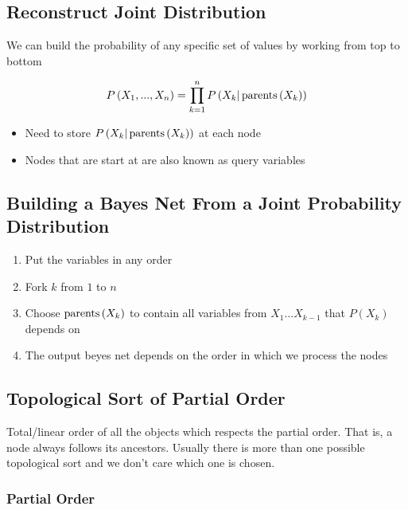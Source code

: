   \subsection{Reconstruct Joint Distribution}

    We can build the probability of any specific set of values by working
    from top to bottom

    \begin{equation}
      P\left( X_{1}, ... , X_{n} \right)
        = \prod_{k = 1}^{n} P\left( X_{k} | \operatorname{parents}\left( X_{k} \right) \right)
    \end{equation}

    \begin{itemize}
      \item Need to store $ P\left( X_{k} | \operatorname{parents}\left( X_{k} \right) \right) $
      at each node
      \item Nodes that are start at are also known as query variables
    \end{itemize}

  \subsection{Building a Bayes Net From a Joint Probability Distribution}

    \begin{enumerate}
      \item Put the variables in any order
      \item Fork $ k $ from $ 1 $ to $ n $
      \item Choose $ \operatorname{parents}\left( X_{k} \right) $ to contain all variables
      from $ X_{1} ... X_{k - 1} $ that $ P\left( X_{k} \right) $ depends on
      \item The output beyes net depends on the order in which we process
      the nodes
    \end{enumerate}

  \subsection{Topological Sort of Partial Order}

    Total/linear order of all the objects which respects the partial order.
    That is, a node always follows its ancestors.
    Usually there is more than one possible topological sort
    and we don't care which one is chosen.

    \subsubsection{Partial Order}

